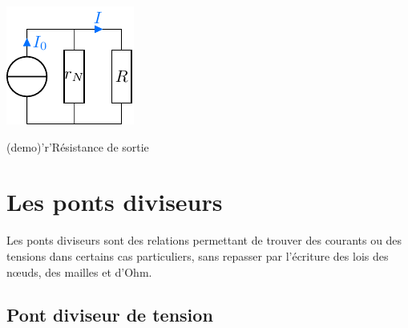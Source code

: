 \documentclass[../../main/main.tex]{subfiles}
\begin{document}
\begin{tcbraster}[raster columns=2, raster equal height=rows]
\begin{tcb}[label=prop:rsortie, sidebyside]
\begin{center}
{				\includegraphics[width=\linewidth]{rsortie_intens}
			}
		\end{center}
	\end{tcb}
	\begin{tcb}[label=demo:rsortie](demo)'r'{Résistance de sortie}
	\end{tcb}
\end{tcbraster}

\section{Les ponts diviseurs}

Les ponts diviseurs sont des relations permettant de trouver des courants ou des
tensions dans certains cas particuliers, sans repasser par l'écriture des lois
des nœuds, des mailles et d'Ohm.

\subsection{Pont diviseur de tension}
\end{document}
